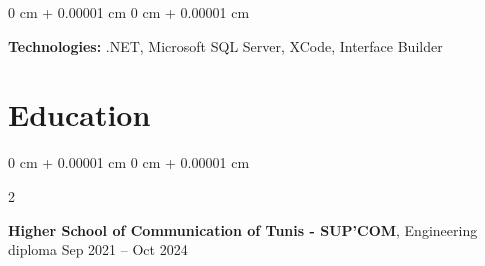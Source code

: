 \documentclass[10pt, letterpaper]{article}
\newenvironment{onecolentry}{
    \begin{adjustwidth}{
        0 cm + 0.00001 cm
    }{
        0 cm + 0.00001 cm
    }
}{
    \end{adjustwidth}
} %
\newenvironment{twocolentry}[2][]{
    \onecolentry
    \def\secondColumn{#2}
    \setcolumnwidth{\fill, 4.5 cm}
    \begin{paracol}{2}
}{
    \switchcolumn \raggedleft \secondColumn
    \end{paracol}
    \endonecolentry
} %
\begin{document}
        \begin{onecolentry}
            \textbf{Technologies:} .NET, Microsoft SQL Server, XCode, Interface Builder
        \end{onecolentry}




    \section{Education} 
        \begin{twocolentry}{
            Sep 2021 – Oct 2024
        }
            \textbf{Higher School of Communication of Tunis - SUP’COM}, Engineering diploma \end{twocolentry}

    
\end{document}
